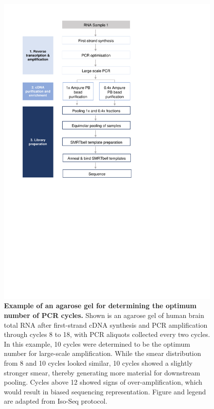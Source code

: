 \begin{figure}[htp]
	\begin{center}
		\includegraphics[page=13,trim={1cm 24cm 10cm 1cm},clip,scale = 0.9]{Figures/ProjectDevelopment_Figures.pdf}
	\end{center}
	\captionsetup{width=0.95\textwidth}
	\caption[Example of an agarose gel for determining the optimum number of PCR cycles]%
	{\textbf{Example of an agarose gel for determining the optimum number of PCR cycles.} Shown is an agarose gel of human brain total RNA after first-strand cDNA synthesis and PCR amplification through cycles 8 to 18, with PCR aliquots collected every two cycles. In this example, 10 cycles were determined to be the optimum number for large-scale amplification. While the smear distribution from 8 and 10 cycles looked similar, 10 cycles showed a slightly stronger smear, thereby generating more material for downstream pooling. Cycles above 12 showed signs of over-amplification, which would result in biased sequencing representation. Figure and legend are adapted from Iso-Seq protocol.}
	\label{fig:pcr_optimisation_gel_eg}
\end{figure}


